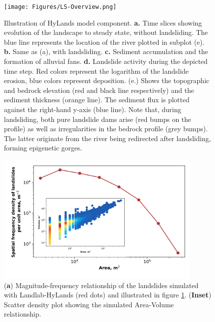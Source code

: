 \documentclass[12pt]{amsart}
\begin{document}
\begin{figure}
\texttt{[image: Figures/LS-Overview.png]}
\caption{Illustration of HyLands model component. \textbf{a.} Time slices showing evolution of the landscape to steady state, without landsliding. The blue line represents the location of the river plotted in subplot (e). \textbf{b.} Same as (a), with landsliding. \textbf{c.} Sediment accumulation and the formation of alluvial fans. \textbf{d.} Landslide activity during the depicted time step. Red colors represent the logarithm of the landslide erosion, blue colors represent deposition. (e.) Shows the topographic and bedrock elevation (red and black line respectively) and the sediment thickness (orange line). The sediment flux is plotted against the right-hand y-axis (blue line). Note that, during landsliding, both pure landslide dams arise (red bumps on the profile) as well as irregularities in the bedrock profile (grey bumps). The latter originate from the river being redirected after landsliding, forming epigenetic gorges.}
\label{fig:landslides}
\end{figure}

\begin{figure}[t]
\includegraphics[width=10cm]{Figures/LS-Mag-Freq.png}
\caption{(\textbf{a}) Magnitude-frequency relationship of the landslides simulated with Landlab-HyLands (red dots) and illustrated in figure \ref{fig:landslides}. (\textbf{Inset}) Scatter density plot showing the simulated Area-Volume relationship.}
\label{fig:MF-landslides}
\end{figure}
\end{document}
